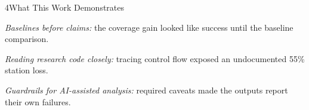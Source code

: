 \documentclass[10pt]{article}
\newcommand{\sectionhead}[1]{%
  \par\vspace{8pt}%
  {\headfont\fontsize{12.5}{15}\selectfont\color{navy}#1\par}%
  \vspace{2.5pt}{\color{rulegray}\hrule height 0.6pt}\vspace{4pt}}
\newlength{\itemgap}\setlength{\itemgap}{1.5pt}
\newenvironment{points}{\begin{list}{\textcolor{navy}{\small\textbullet}}{%
  \setlength{\leftmargin}{1.05em}\setlength{\labelwidth}{0.7em}%
  \setlength{\labelsep}{0.4em}\setlength{\itemsep}{\itemgap}%
  \setlength{\parsep}{0pt}\setlength{\topsep}{1pt}\setlength{\partopsep}{0pt}}}%
  {\end{list}}
\begin{document}
\sectionhead{4\quad What This Work Demonstrates}
\begin{points}
  \item \textit{Baselines before claims:} the coverage gain looked like success until the baseline
    comparison.
  \item \textit{Reading research code closely:} tracing control flow exposed an undocumented 55\%
    station loss.
  \item \textit{Guardrails for AI-assisted analysis:} required caveats made the outputs report their own
    failures.
\end{points}
\end{document}
